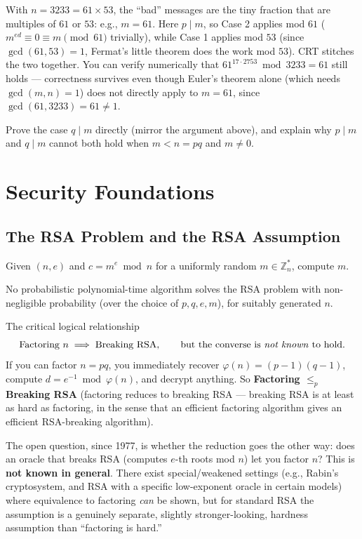 \begin{example}
With $n = 3233 = 61 \times 53$, the ``bad'' messages are the tiny fraction that are multiples of $61$ or $53$: e.g., $m = 61$. Here $p \mid m$, so Case 2 applies mod $61$ ($m^{ed} \equiv 0 \equiv m \pmod{61}$ trivially), while Case 1 applies mod $53$ (since $\gcd(61,53)=1$, Fermat's little theorem does the work mod $53$). CRT stitches the two together. You can verify numerically that $61^{17 \cdot 2753} \bmod 3233 = 61$ still holds — correctness survives even though Euler's theorem alone (which needs $\gcd(m,n)=1$) does not directly apply to $m=61$, since $\gcd(61,3233)=61 \ne 1$.
\end{example}

\begin{exercise}
Prove the case $q \mid m$ directly (mirror the argument above), and explain why $p \mid m$ and $q \mid m$ cannot both hold when $m < n = pq$ and $m \ne 0$.
\end{exercise}

\newpage
\section{Security Foundations}

\subsection{The RSA Problem and the RSA Assumption}

\begin{definition}
Given $(n, e)$ and $c = m^e \bmod n$ for a uniformly random $m \in \mathbb{Z}_n^{*}$, compute $m$.
\end{definition}

\begin{definition}
No probabilistic polynomial-time algorithm solves the RSA problem with non-negligible probability (over the choice of $p, q, e, m$), for suitably generated $n$.
\end{definition}

\begin{keybox}{The critical logical relationship}
\[
\text{Factoring } n \implies \text{Breaking RSA}, \qquad \text{but the converse is \emph{not known} to hold.}
\]
If you can factor $n = pq$, you immediately recover $\varphi(n) = (p-1)(q-1)$, compute $d = e^{-1} \bmod \varphi(n)$, and decrypt anything. So \textbf{Factoring $\leq_p$ Breaking RSA} (factoring reduces to breaking RSA — breaking RSA is at least as hard as factoring, in the sense that an efficient factoring algorithm gives an efficient RSA-breaking algorithm).

The open question, since 1977, is whether the reduction goes the other way: does an oracle that breaks RSA (computes $e$-th roots mod $n$) let you factor $n$? This is \textbf{not known in general}. There exist special/weakened settings (e.g., Rabin's cryptosystem, and RSA with a specific low-exponent oracle in certain models) where equivalence to factoring \emph{can} be shown, but for standard RSA the assumption is a genuinely separate, slightly stronger-looking, hardness assumption than ``factoring is hard.''
\end{keybox}

